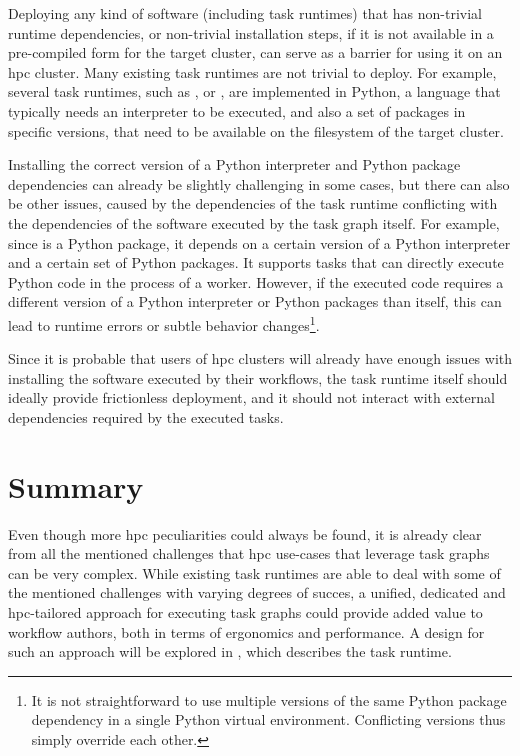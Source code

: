 Deploying any kind of software (including task runtimes) that has non-trivial runtime dependencies,
or non-trivial installation steps, if it is not available in a pre-compiled form for the target
cluster, can serve as a barrier for using it on an \gls{hpc} cluster. Many
existing task runtimes are not trivial to deploy. For example, several task runtimes, such as \dask{},
\snakemake{} or \pycompss{}, are implemented in Python, a language
that typically needs an interpreter to be executed, and also a set of packages in specific
versions, that need to be available on the filesystem of the target cluster.

Installing the correct version of a Python interpreter and Python package dependencies can already
be slightly challenging in some cases, but there can also be other issues, caused by the
dependencies of the task runtime conflicting with the dependencies of the software executed by the
task graph itself. For example, since \dask{} is a Python package, it depends
on a certain version of a Python interpreter and a certain set of Python packages. It supports
tasks that can directly execute Python code in the process of a \dask{} worker.
However, if the executed code requires a different version of a Python interpreter or Python
packages than \dask{} itself, this can lead to runtime errors or subtle
behavior changes\footnote{It is not straightforward to use multiple versions of the same Python package dependency in a
single Python virtual environment. Conflicting versions thus simply override each other.}.

Since it is probable that users of \gls{hpc} clusters will already have enough
issues with installing the software executed by their workflows, the task runtime itself should
ideally provide frictionless deployment, and it should not interact with external dependencies
required by the executed tasks.

\section*{Summary}
Even though more \gls{hpc} peculiarities could always be found, it is
already clear from all the mentioned challenges that \gls{hpc} use-cases that
leverage task graphs can be very complex. While existing task runtimes are able to deal with some of
the mentioned challenges with varying degrees of succes, a unified, dedicated and
\gls{hpc}-tailored approach for executing task graphs could provide added value to workflow authors, both in terms of
ergonomics and performance. A design for such an approach will be explored in
, which describes the \hyperqueue{} task runtime.
